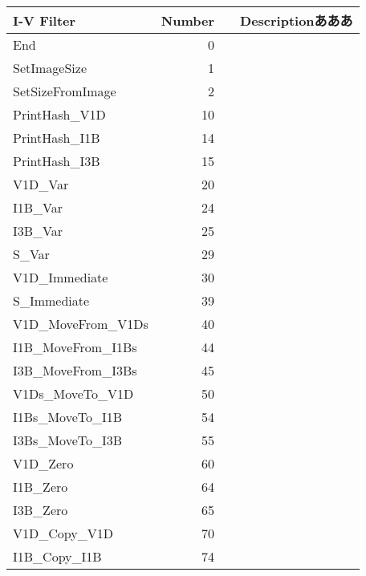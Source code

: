 \documentclass[11pt]{jsbook} %
\begin{document}
\begin{tabular}{l|r|l}
  I-V Filter & Number &　Descriptionあああ \\
  \hline \hline 
  End                            & 0 & \\
                           
  SetImageSize                   & 1 &  \\
  SetSizeFromImage               & 2 &  \\
                           
  PrintHash\_V1D                  & 10 &  \\
  PrintHash\_I1B                  & 14 &  \\
  PrintHash\_I3B                  & 15 &  \\
                           
  V1D\_Var                        & 20 &  \\
  I1B\_Var                        & 24 &  \\
  I3B\_Var                        & 25 &  \\
  S\_Var                          & 29 &  \\
                           
  V1D\_Immediate                  & 30 &  \\
  S\_Immediate                    & 39 &  \\
                           
  V1D\_MoveFrom\_V1Ds              & 40 &  \\
  I1B\_MoveFrom\_I1Bs              & 44 &  \\
  I3B\_MoveFrom\_I3Bs              & 45 &  \\
                           
  V1Ds\_MoveTo\_V1D                & 50 &  \\
  I1Bs\_MoveTo\_I1B                & 54 &  \\
  I3Bs\_MoveTo\_I3B                & 55 &  \\
                           
  V1D\_Zero                       & 60 &  \\
  I1B\_Zero                       & 64 &  \\
  I3B\_Zero                       & 65 &  \\
                           
  V1D\_Copy\_V1D                   & 70 &  \\
  I1B\_Copy\_I1B                   & 74 &  \\
                           

\end{tabular}
\end{document}

